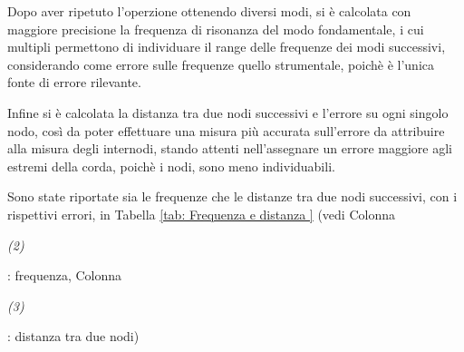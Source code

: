 \documentclass[12pt, a4paper]{article}
\begin{document}
Dopo aver ripetuto l'operzione ottenendo diversi modi, si è calcolata con maggiore precisione la frequenza di risonanza del modo fondamentale, i cui multipli permettono di individuare il range delle frequenze dei modi successivi, considerando come errore sulle frequenze quello strumentale, poichè è l'unica fonte di errore rilevante.
 \bigskip
 
Infine si è calcolata la distanza tra due nodi successivi e l'errore su ogni singolo nodo, così da poter effettuare una misura più accurata sull'errore da attribuire alla misura degli internodi, stando attenti nell'assegnare un errore maggiore agli estremi della corda, poichè i nodi, sono meno individuabili.


Sono state riportate sia le frequenze che le distanze tra due nodi successivi, con i rispettivi errori, in Tabella \ref{tab: Frequenza e distanza } (vedi Colonna \begin{footnotesize}{\textit{(2)}}\end{footnotesize}: frequenza, Colonna \begin{footnotesize}{\textit{(3)}}\end{footnotesize}: distanza tra due nodi) 
\end{document}
